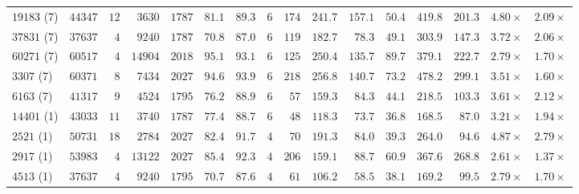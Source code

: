\begin{table}[t]
{\begin{tabular}{@{}lrrrrrrc|r|rrr|rr|rr@{}}
$19183$ (7) & $44347$ & $12$ & $3630$ & $1787$ & $81.1$ & $89.3$ & $6$ & $174$ & $241.7$ & $157.1$ & \cellcolor{green!15}$\mathbf{50.4}$ & $419.8$ & \cellcolor{green!15}$\mathbf{201.3}$ & \cellcolor{green!15}$\mathbf{4.80\times}$ & \cellcolor{green!15}$\mathbf{2.09\times}$\\
$37831$ (7) & $37637$ & $4$ & $9240$ & $1787$ & $70.8$ & $87.0$ & $6$ & $119$ & $182.7$ & $78.3$ & \cellcolor{green!15}$\mathbf{49.1}$ & $303.9$ & \cellcolor{green!15}$\mathbf{147.3}$ & \cellcolor{green!15}$\mathbf{3.72\times}$ & \cellcolor{green!15}$\mathbf{2.06\times}$\\
$60271$ (7) & $60517$ & $4$ & $14904$ & $2018$ & $95.1$ & $93.1$ & $6$ & $125$ & $250.4$ & $135.7$ & \cellcolor{green!15}$\mathbf{89.7}$ & $379.1$ & \cellcolor{green!15}$\mathbf{222.7}$ & \cellcolor{green!15}$\mathbf{2.79\times}$ & \cellcolor{green!15}$\mathbf{1.70\times}$\\
$3307$ (7) & $60371$ & $8$ & $7434$ & $2027$ & $94.6$ & $93.9$ & $6$ & $218$ & $256.8$ & $140.7$ & \cellcolor{green!15}$\mathbf{73.2}$ & $478.2$ & \cellcolor{green!15}$\mathbf{299.1}$ & \cellcolor{green!15}$\mathbf{3.51\times}$ & \cellcolor{green!15}$\mathbf{1.60\times}$\\
$6163$ (7) & $41317$ & $9$ & $4524$ & $1795$ & $76.2$ & $88.9$ & $6$ & $57$ & $159.3$ & $84.3$ & \cellcolor{green!15}$\mathbf{44.1}$ & $218.5$ & \cellcolor{green!15}$\mathbf{103.3}$ & \cellcolor{green!15}$\mathbf{3.61\times}$ & \cellcolor{green!15}$\mathbf{2.12\times}$\\
$14401$ (1) & $43033$ & $11$ & $3740$ & $1787$ & $77.4$ & $88.7$ & $6$ & $48$ & $118.3$ & $73.7$ & \cellcolor{green!15}$\mathbf{36.8}$ & $168.5$ & \cellcolor{green!15}$\mathbf{87.0}$ & \cellcolor{green!15}$\mathbf{3.21\times}$ & \cellcolor{green!15}$\mathbf{1.94\times}$\\
$2521$ (1) & $50731$ & $18$ & $2784$ & $2027$ & $82.4$ & $91.7$ & $4$ & $70$ & $191.3$ & $84.0$ & \cellcolor{green!15}$\mathbf{39.3}$ & $264.0$ & \cellcolor{green!15}$\mathbf{94.6}$ & \cellcolor{green!15}$\mathbf{4.87\times}$ & \cellcolor{green!15}$\mathbf{2.79\times}$\\
$2917$ (1) & $53983$ & $4$ & $13122$ & $2027$ & $85.4$ & $92.3$ & $4$ & $206$ & $159.1$ & $88.7$ & \cellcolor{green!15}$\mathbf{60.9}$ & $367.6$ & \cellcolor{green!15}$\mathbf{268.8}$ & \cellcolor{green!15}$\mathbf{2.61\times}$ & \cellcolor{green!15}$\mathbf{1.37\times}$\\
$4513$ (1) & $37637$ & $4$ & $9240$ & $1795$ & $70.7$ & $87.6$ & $4$ & $61$ & $106.2$ & $58.5$ & \cellcolor{green!15}$\mathbf{38.1}$ & $169.2$ & \cellcolor{green!15}$\mathbf{99.5}$ & \cellcolor{green!15}$\mathbf{2.79\times}$ & \cellcolor{green!15}$\mathbf{1.70\times}$\\

\end{tabular}}
\end{table}
